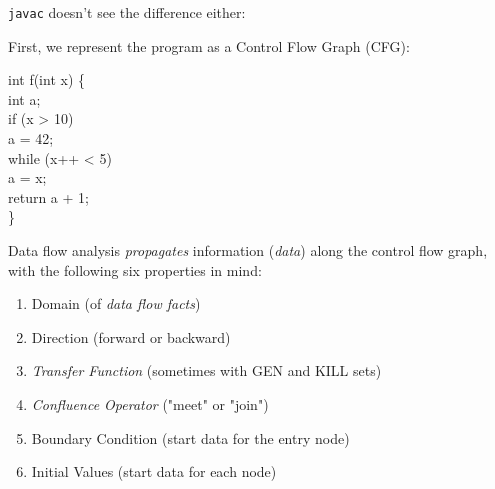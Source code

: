 \documentclass{article}
\begin{document}
\plush{}


\texttt{javac} doesn't see the difference either:


\plush{}



First, we represent the program as a Control Flow Graph (CFG):

\begin{multicols}{2}
{\ttfamily
int f(int x) \{ \\
\quad  int a; \\
\quad  if (x > 10) \\
\quad\quad a = 42; \\
\quad  while (x++ < 5) \\
\quad\quad    a = x; \\
\quad  return a + 1; \\
\}}
\par\columnbreak\par
{}
\end{multicols}

\plush{}


Data flow analysis \emph{propagates} information (\emph{data}) along the control flow graph, with the following six properties in mind:

\begin{enumerate}
    \item Domain (of \emph{data flow facts})
    \item Direction (forward or backward)
    \item \emph{Transfer Function} (sometimes with GEN and KILL sets)
    \item \emph{Confluence Operator} ("meet" or "join")
    \item Boundary Condition (start data for the entry node)
    \item Initial Values (start data for each node)
\end{enumerate}
\end{document}
